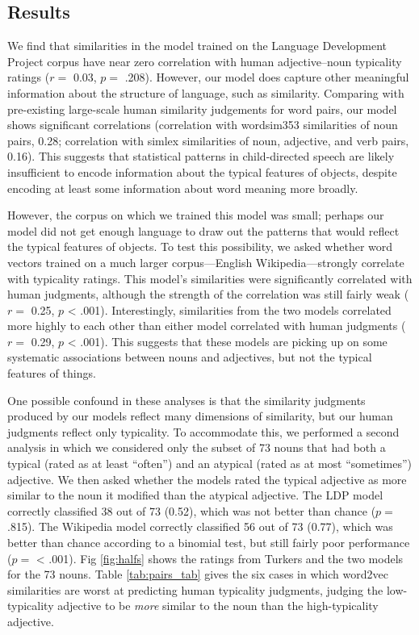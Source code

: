 \documentclass[10pt, letterpaper]{article}
\begin{document}
\hypertarget{results-1}{%
\subsection{Results}\label{results-1}}

We find that similarities in the model trained on the Language
Development Project corpus have near zero correlation with human
adjective--noun typicality ratings (\(r =\) 0.03, \(p =\) .208).
However, our model does capture other meaningful information about the
structure of language, such as similarity. Comparing with pre-existing
large-scale human similarity judgements for word pairs, our model shows
significant correlations (correlation with wordsim353 similarities of
noun pairs, 0.28; correlation with simlex similarities of noun,
adjective, and verb pairs, 0.16). This suggests that statistical
patterns in child-directed speech are likely insufficient to encode
information about the typical features of objects, despite encoding at
least some information about word meaning more broadly.

However, the corpus on which we trained this model was small; perhaps
our model did not get enough language to draw out the patterns that
would reflect the typical features of objects. To test this possibility,
we asked whether word vectors trained on a much larger corpus---English
Wikipedia---strongly correlate with typicality ratings. This model's
similarities were significantly correlated with human judgments,
although the strength of the correlation was still fairly weak (\(r =\)
0.25, \(p\) \textless{} .001). Interestingly, similarities from the two
models correlated more highly to each other than either model correlated
with human judgments (\(r =\) 0.29, \(p\) \textless{} .001). This
suggests that these models are picking up on some systematic
associations between nouns and adjectives, but not the typical features
of things.

One possible confound in these analyses is that the similarity judgments
produced by our models reflect many dimensions of similarity, but our
human judgments reflect only typicality. To accommodate this, we
performed a second analysis in which we considered only the subset of 73
nouns that had both a typical (rated as at least ``often'') and an
atypical (rated as at most ``sometimes'') adjective. We then asked
whether the models rated the typical adjective as more similar to the
noun it modified than the atypical adjective. The LDP model correctly
classified 38 out of 73 (0.52), which was not better than chance
(\(p =\) .815). The Wikipedia model correctly classified 56 out of 73
(0.77), which was better than chance according to a binomial test, but
still fairly poor performance (\(p =\) \textless{} .001). Fig
\ref{fig:halfs} shows the ratings from Turkers and the two models for
the 73 nouns. Table \ref{tab:pairs_tab} gives the six cases in which
word2vec similarities are worst at predicting human typicality
judgments, judging the low-typicality adjective to be \emph{more}
similar to the noun than the high-typicality adjective.
\end{document}
